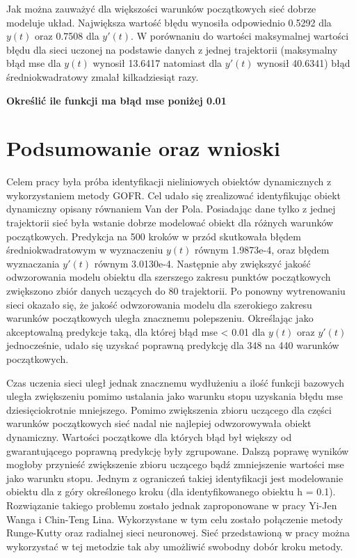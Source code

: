 Jak można zauważyć dla większości warunków początkowych sieć dobrze modeluje układ. Największa wartość błędu wynosiła odpowiednio 0.5292 dla $y(t)$ oraz 0.7508 dla $y'(t)$. W porównaniu do wartości maksymalnej wartości błędu dla sieci uczonej na podstawie danych z jednej trajektorii (maksymalny błąd mse dla $y(t)$ wynosił 13.6417 natomiast dla $y'(t)$ wynosił 40.6341) błąd średniokwadratowy zmalał kilkadziesiąt razy.

\textbf{Określić ile funkcji ma błąd mse poniżej 0.01}

\clearpage
\section{Podsumowanie oraz wnioski}

Celem pracy była próba identyfikacji nieliniowych obiektów dynamicznych z wykorzystaniem metody GOFR. Cel udało się zrealizować identyfikując obiekt dynamiczny opisany równaniem Van der Pola. Posiadając dane tylko z jednej trajektorii sieć była wstanie dobrze modelować obiekt dla różnych warunków początkowych. Predykcja na 500 kroków w przód skutkowała błędem średniokwadratowym w wyznaczeniu $y(t)$ równym 1.9873e-4, oraz błędem wyznaczania $y'(t)$ równym 3.0130e-4. Następnie aby zwiększyć jakość odwzorowania modelu obiektu dla szerszego zakresu punktów początkowych zwiększono zbiór danych uczących do 80 trajektorii. Po ponowny wytrenowaniu sieci okazało się, że jakość odwzorowania modelu dla szerokiego zakresu warunków początkowych uległa znacznemu polepszeniu.
Określając jako akceptowalną predykcje taką, dla której błąd mse < 0.01 dla $y(t)$ oraz $y'(t)$ jednocześnie, udało się uzyskać poprawną predykcję dla 348 na 440 warunków początkowych.

Czas uczenia sieci uległ jednak znacznemu wydłużeniu a ilość funkcji bazowych uległa zwiększeniu pomimo ustalania jako warunku stopu uzyskania błędu mse dziesięciokrotnie mniejszego. Pomimo zwiększenia zbioru uczącego dla części warunków początkowych sieć nadal nie najlepiej odwzorowywała obiekt dynamiczny.  Wartości początkowe dla których błąd był większy od gwarantującego poprawną predykcję były zgrupowane. Dalszą poprawę wyników mogłoby przynieść zwiększenie zbioru uczącego bądź zmniejszenie wartości mse jako warunku stopu. Jednym z ograniczeń takiej identyfikacji jest modelowanie obiektu dla z góry określonego kroku (dla identyfikowanego obiektu h = 0.1). Rozwiązanie takiego problemu zostało jednak zaproponowane w pracy Yi-Jen Wanga i Chin-Teng Lina\cite{Wang}. Wykorzystane w tym celu zostało połączenie metody Runge-Kutty oraz radialnej sieci neuronowej. Sieć przedstawioną w pracy można wykorzystać w tej metodzie tak aby umożliwić swobodny dobór kroku metody.

